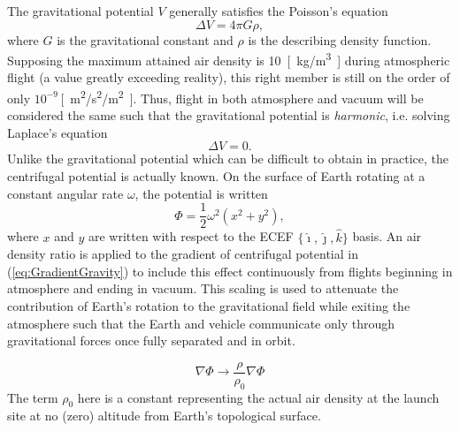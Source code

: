 \documentclass[11pt,dvipsnames]{thesis}
\begin{document}
The gravitational potential $V$ generally satisfies the Poisson's equation
\begin{equation}
\Delta V = 4\pi G \rho,
\end{equation}
where $G$ is the gravitational constant and $\rho$ is the describing density function. Supposing the maximum attained air density is \SI{10}{[\kg/\m\cubed]} during atmospheric flight (a value greatly exceeding reality), this right member is still on the order of only $10^{-9}$\,\si{[\m\squared/\s\squared/\m\squared]}. Thus, flight in both atmosphere and vacuum will be considered the same such that the gravitational potential is \textit{harmonic}, i.e. solving Laplace's equation
\begin{equation}
\Delta V = 0. \label{eq:GravPotential}
\end{equation}
Unlike the gravitational potential which can be difficult to obtain in practice, the centrifugal potential is actually known. On the surface of Earth rotating at a constant angular rate $\omega$, the potential is written
\begin{equation}
\Phi = \frac{1}{2}\omega^2 (x^2 + y^2), \label{eq:CentrPotential}
\end{equation}
where $x$ and $y$ are written with respect to the ECEF $\{\hat{\imath}, \hat{\jmath}, \hat{k}\}$ basis. 
An air density ratio is applied to the gradient of centrifugal potential in (\ref{eq:GradientGravity}) to include this effect continuously from flights beginning in atmosphere and ending in vacuum. This scaling is used to attenuate the contribution of Earth's rotation to the gravitational field while exiting the atmosphere such that the Earth and vehicle communicate only through gravitational forces once fully separated and in orbit.

\begin{equation}
\nabla\Phi \to \frac{\rho}{\rho_0}\nabla\Phi
\end{equation}
The term $\rho_0$ here is a constant representing the actual air density at the launch site at no (zero) altitude from Earth's topological surface.
\end{document}
